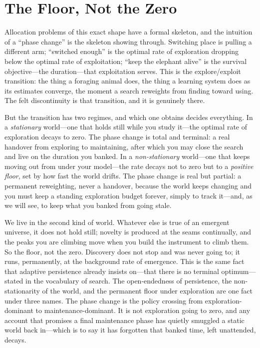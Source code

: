 \documentclass{article}
\begin{document}
\section*{The Floor, Not the Zero}

Allocation problems of this exact shape have a formal skeleton, and the intuition of a ``phase change'' is the skeleton showing through. Switching place is pulling a different arm; ``switched enough'' is the optimal rate of exploration dropping below the optimal rate of exploitation; ``keep the elephant alive'' is the survival objective---the duration---that exploitation serves. This is the explore/exploit transition: the thing a foraging animal does, the thing a learning system does as its estimates converge, the moment a search reweights from finding toward using. The felt discontinuity is that transition, and it is genuinely there.

But the transition has two regimes, and which one obtains decides everything. In a \textit{stationary} world---one that holds still while you study it---the optimal rate of exploration decays to zero. The phase change is total and terminal: a real handover from exploring to maintaining, after which you may close the search and live on the duration you banked. In a \textit{non-stationary} world---one that keeps moving out from under your model---the rate decays not to zero but to a \textit{positive floor}, set by how fast the world drifts. The phase change is real but partial: a permanent reweighting, never a handover, because the world keeps changing and you must keep a standing exploration budget forever, simply to track it---and, as we will see, to keep what you banked from going stale.

We live in the second kind of world. Whatever else is true of an emergent universe, it does not hold still; novelty is produced at the seams continually, and the peaks you are climbing move when you build the instrument to climb them. So the floor, not the zero. Discovery does not stop and was never going to; it runs, permanently, at the background rate of emergence. This is the same fact that adaptive persistence already insists on---that there is no terminal optimum---stated in the vocabulary of search. The open-endedness of persistence, the non-stationarity of the world, and the permanent floor under exploration are one fact under three names. The phase change is the policy crossing from exploration-dominant to maintenance-dominant. It is not exploration going to zero, and any account that promises a final maintenance phase has quietly smuggled a static world back in---which is to say it has forgotten that banked time, left unattended, decays.
\end{document}
